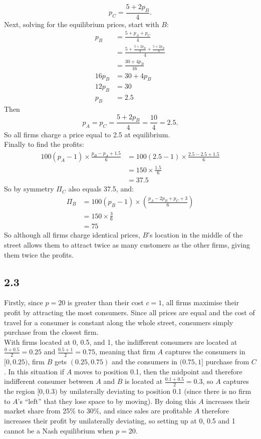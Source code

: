 \documentclass{article}
\begin{document}
$$p_{C} = \frac{5 + 2p_{B}}{4}.$$
Next, solving for the equilibrium prices, start with $B$:
\begin{align*}
    p_{B} &= \frac{5 + p_{A} + p_{C}}{4}\\
    &= \frac{5 + \frac{5 + 2p_{B}}{4} + \frac{5 + 2p_{B}}{4}}{4}\\
    &= \frac{30 + 4p_{B}}{16}\\
    16p_{B} &= 30 + 4p_{B}\\
    12p_{B} &= 30\\
    p_{B} &= 2.5
\end{align*}
Then
$$p_{A} = p_{C} = \frac{5 + 2p_{B}}{4} = \frac{10}{4} = 2.5.$$
So all firms charge a price equal to 2.5 at equilibrium.\\[2mm]
Finally to find the profits:
\begin{align*}
    100(p_{A} - 1) \times \frac{p_{B} - p_{A} + 1.5}{6} &= 100(2.5 - 1) \times \frac{2.5 - 2.5 + 1.5}{6}\\
    &= 150 \times \frac{1.5}{6}\\
    &= 37.5
\end{align*}
So by symmetry $\Pi_{C}$ also equals 37.5, and:
\begin{align*}
    \Pi_{B} &= 100(p_{B} - 1) \times \left( \frac{p_{A} - 2p_{B} + p_{C} + 3}{6} \right)\\
    &= 150 \times \frac{3}{6}\\
    &= 75
\end{align*}
So although all firms charge identical prices, $B$'s location in the middle of the street allows them to attract twice as many customers as the other firms, giving them twice the profits.

\subsection*{2.3}
Firstly, since $p=20$ is greater than their cost $c=1$, all firms maximise their profit by attracting the most consumers. Since all prices are equal and the cost of travel for a consumer is constant along the whole street, consumers simply purchase from the closest firm.\\[2mm]
With firms located at 0, 0.5, and 1, the indifferent consumers are located at $\frac{0 + 0.5}{2} = 0.25$ and $\frac{0.5 + 1}{2} = 0.75$, meaning that firm $A$ captures the consumers in $[0, 0.25)$, firm $B$ gets $(0.25, 0.75)$ and the consumers in $(0.75, 1]$ purchase from $C$. In this situation if $A$ moves to position 0.1, then the midpoint and therefore indifferent consumer between $A$ and $B$ is located at $\frac{0.1 + 0.5}{2} = 0.3$, so $A$ captures the region $[0, 0.3)$ by unilaterally deviating to position 0.1 (since there is no firm to $A$'s ``left'' that they lose space to by moving). By doing this $A$ increases their market share from 25\% to 30\%, and since sales are profitable $A$ therefore increases their profit by unilaterally deviating, so setting up at 0, 0.5 and 1 cannot be a Nash equilibrium when $p=20$.
\end{document}
